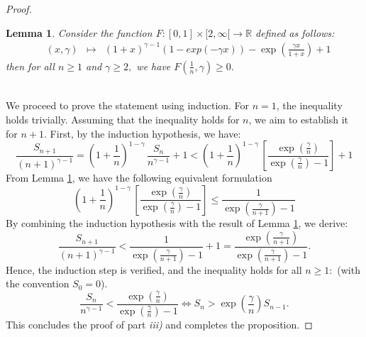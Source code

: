 \documentclass[10pt,a4paper]{amsart}
\newtheorem{lem}{Lemma}
\newcommand{\R}{\mathbb{R}}
\begin{document}
\begin{proof}
\begin{lem} \label{lemma 4.2} Consider the function 
$F : [0,1]\times[2,\infty[ \longrightarrow  \R$ defined as follows:
$$\begin{array}{lrcl}
     &(x,\gamma) & \longmapsto & (1+x)^{\gamma-1} (1-exp(-\gamma x) ) - \exp \left( \frac{\gamma x}{1+x} \right) +1 \end{array}
$$
then for all $n \geq 1$ and $\gamma \geq 2,$ we have $F(\frac{1}{n} ,\gamma) \geq 0.$
\end{lem}
\phantom{.} \\
We proceed to prove the statement using induction.
For \( n = 1 \), the inequality holds trivially. Assuming that the inequality holds for \( n \), we aim to establish it for \( n + 1 \). First, by the induction hypothesis, we have:
$$ \frac{S_{n+1}} {(n+1)^{\gamma-1}} = ( 1+ \frac{1}{n})^{1-\gamma} \,  \frac{S_{n}}{n^{\gamma-1}} +1 <
( 1+ \frac{1}{n})^{1-\gamma} \, \left[ \frac{\exp(\frac{\gamma}{n})}{\exp(\frac{\gamma}{n})-1} \right] + 1$$
From Lemma \ref{lemma 4.2}, we have the following equivalent formulation
$$( 1+ \frac{1}{n})^{1-\gamma}  \, \left[ \frac{\exp(\frac{\gamma}{n})}{\exp(\frac{\gamma}{n})-1} \right]  \leq \frac{1}{\exp(\frac{\gamma}{n+1})-1}$$
By combining the induction hypothesis with the result of Lemma \ref{lemma 4.2}, we derive:
$$\frac{S_{n+1}} {(n+1)^{\gamma-1}}
<   \frac{1}{\exp(\frac{\gamma}{n+1})-1} +1  =  \frac{\exp(\frac{\gamma}{n+1})}{\exp(\frac{\gamma}{n+1})-1}.$$ Hence, the induction step is verified, and the inequality holds for all $n \geq 1:$ (with the convention $S_{0}=0$).
$$ \frac{S_n}{n^{\gamma-1}} < \frac{\exp(\frac{\gamma}{n})}{\exp(\frac{\gamma}{n})-1} \Leftrightarrow S_{n} > \exp(\frac{\gamma}{n}) S_{n-1}.
$$
This concludes the proof of part \textit{iii)} and completes the proposition.
\end{proof}
\end{document}

